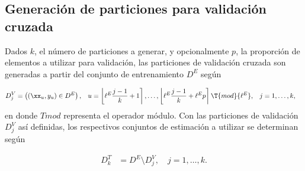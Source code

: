 \subsection{Generación de particiones para validación cruzada}
Dados $k$, el número de particiones a generar, y opcionalmente $p$, la
proporción de elementos a utilizar para validación, las particiones de
validación cruzada son generadas a partir del conjunto de
entrenamiento $D^E$ según

\begin{align*}
  D^V_j &= \left( (\xx_u,y_u) \in {D}^E \right), &
  u &= \left\lfloor\ell^E\frac{j-1}{k}+1\right\rceil,\ldots,
  \left\lfloor\ell^E\frac{j-1}{k}+\ell^E p\right\rceil\T{mod}{\ell^E}, &
  j &= 1,\ldots,k,
\end{align*}
en donde $T{mod}$ representa el operador módulo.
Con las particiones de validación $D^V_j$ así definidas, los respectivos
conjuntos de estimación a utilizar se determinan según

\begin{align*}
  D^T_k &= D^E \setminus D^V_j, \quad j=1,\ldots,k.  
\end{align*}